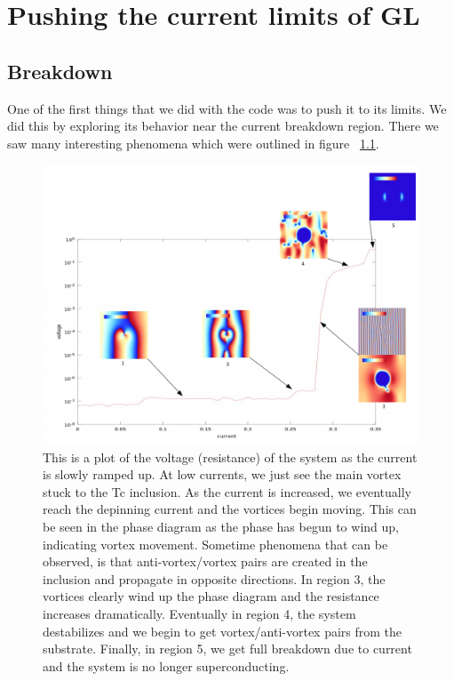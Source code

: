\chapter{Pushing the current limits of GL}

\section{Breakdown}
One of the first things that we did with the code was to push it to its limits. We did this by exploring its behavior near the current breakdown region. There we saw many interesting phenomena which were outlined in figure ~\ref{breakdown}.

\begin{figure}[htbp]
\begin{center}
\includegraphics[scale=.50]{breakdownBreakdown.png}
\caption{This is a plot of the voltage (resistance) of the system as the current is slowly ramped up. At low currents, we just see the main vortex stuck to the Tc inclusion. As the current is increased, we eventually reach the depinning current and the vortices begin moving. This can be seen in the phase diagram as the phase has begun to wind up, indicating vortex movement. Sometime phenomena that can be observed, is that anti-vortex/vortex pairs are created in the inclusion and propagate in opposite directions. In region 3, the vortices clearly wind up the phase diagram and the resistance increases dramatically. Eventually in region 4, the system destabilizes and we begin to get vortex/anti-vortex pairs from the substrate. Finally, in region 5, we get full breakdown due to current and the system is no longer superconducting.}
\label{breakdown}
\end{center}
\end{figure}

